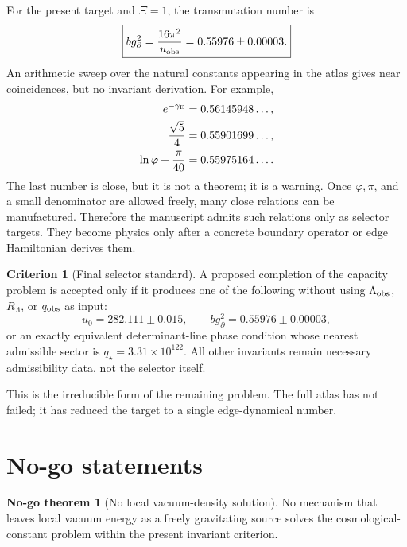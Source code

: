 \documentclass[aps,prd,reprint,nofootinbib,superscriptaddress,floatfix]{revtex4-2}
\numberwithin{equation}{section}
\theoremstyle{definition}
\newtheorem{criterion}{Criterion}[section]
\newtheorem{nogotheorem}{No-go theorem}[section]
\theoremstyle{plain}
\begin{document}
For the present target and \(\Xi=1\), the transmutation number is
\begin{equation}
\boxed{
b g_\partial^2=
\frac{16\pi^2}{u_{\rm obs}}
=0.55976\pm0.00003 .
}
\end{equation}
An arithmetic sweep over the natural constants appearing in the atlas gives
near coincidences, but no invariant derivation.  For example,
\begin{align}
e^{-\gamma_{\rm E}}&=0.56145948\ldots,\\
\frac{\sqrt5}{4}&=0.55901699\ldots,\\
\ln\varphi+\frac{\pi}{40}&=0.55975164\ldots .
\end{align}
The last number is close, but it is not a theorem; it is a warning.  Once
\(\varphi,\pi\), and a small denominator are allowed freely, many close
relations can be manufactured.  Therefore the manuscript admits such
relations only as selector targets.  They become physics only after a concrete
boundary operator or edge Hamiltonian derives them.

\begin{criterion}[Final selector standard]
A proposed completion of the capacity problem is accepted only if it produces
one of the following without using \(\Lambda_{\rm obs}\), \(R_\Lambda\), or
\(q_{\rm obs}\) as input:
\begin{equation}
\boxed{
u_0=282.111\pm0.015 ,
\qquad
b g_\partial^2=0.55976\pm0.00003 ,
}
\end{equation}
or an exactly equivalent determinant-line phase condition whose nearest
admissible sector is \(q_\star=3.31\times10^{122}\).  All other invariants
remain necessary admissibility data, not the selector itself.
\end{criterion}

This is the irreducible form of the remaining problem.  The full atlas has
not failed; it has reduced the target to a single edge-dynamical number.

\section{No-go statements}

\begin{nogotheorem}[No local vacuum-density solution]\label{nogo:vacuum-density}
No mechanism that leaves local vacuum energy as a freely gravitating source solves the cosmological-constant problem within the present invariant criterion.
\end{nogotheorem}
\end{document}
